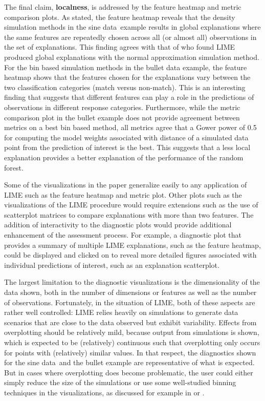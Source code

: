 \documentclass[AMS,STIX2COL]{WileyNJD-v2}\usepackage[]{graphicx}\usepackage[]{color}
\newcommand{\data}{sine data}
\begin{document}
The final claim, \textbf{localness}, is addressed by the feature heatmap and metric comparison plots. As stated, the feature heatmap reveals that the density simulation methods in the \data \ example  results in global explanations where the same features are repeatedly chosen across all (or almost all) observations in the set of explanations. This finding agrees with that of \citet{laugel:2018} who found LIME produced global explanations with the normal approximation simulation method. For the bin based simulation methods in the bullet data example, the feature heatmap shows that the features chosen for the explanations vary between the two classification categories (match versus non-match). This is an interesting finding that suggests that different features can play a role in the predictions of observations in different response categories. Furthermore, while the metric comparison plot in the bullet example does not provide agreement between metrics on a best bin based method, all metrics agree that a Gower power of 0.5 for computing the model weights associated with distance of a simulated data point from the prediction of interest is the best. This suggests that a less local explanation provides a better explanation of the performance of the random forest.

Some of the visualizations in the paper generalize easily to any application of LIME such as the feature heatmap and metric plot. Other plots such as the visualizations of the LIME procedure would require extensions such as the use of scatterplot matrices to compare explanations with more than two features. The addition of interactivity to the diagnostic plots would provide additional enhancement of the assessment process. For example, a diagnostic plot that provides a summary of multiple LIME explanations, such as the feature heatmap, could be displayed and clicked on to reveal more detailed figures associated with individual predictions of interest, such as an explanation scatterplot.

The largest limitation to the diagnostic visualizations is the dimensionality of the data shown, both in the number of dimensions or features as well as the number of observations. Fortunately, in the situation of LIME, both of these aspects are rather well controlled: LIME relies heavily on simulations to generate data scenarios that are close to the data observed but exhibit variability. Effects from overplotting should be relatively mild, because output from simulations is shown, which is expected to be (relatively) continuous such that overplotting only occurs for points with (relatively) similar values. In that respect, the diagnostics shown for the \data \ and the bullet example are representative of what is expected. But in cases where overplotting does become problematic, the user could either simply reduce the size of the simulations or use some well-studied binning techniques in the visualizations, as discussed for example in \citet{carr:1987} or \citet{unwin:2006}. 
\end{document}
